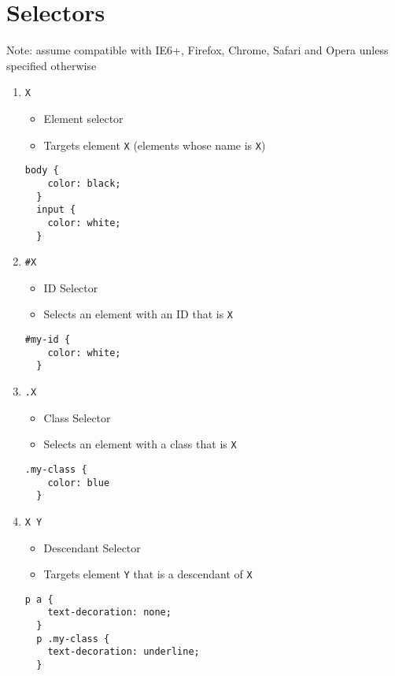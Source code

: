 \documentclass[12pt]{article}
\begin{document}
\section{Selectors}
Note: assume compatible with IE6+, Firefox, Chrome, Safari and Opera unless specified otherwise

\begin{enumerate}
\item {\texttt{X}}
  \begin{itemize}
    \item Element selector
    \item Targets element \texttt{X} (elements whose name is \texttt{X})
  \end{itemize}
  \begin{lstlisting}[frame=single]
  body {
    color: black;
  }
  input {
    color: white;
  }
  \end{lstlisting}

\item {\texttt{\#X}}
  \begin{itemize}
    \item ID Selector
    \item Selects an element with an ID that is \texttt{X}
  \end{itemize}
  \begin{lstlisting}[frame=single]
  #my-id {
    color: white;
  }
  \end{lstlisting}

\item {\texttt{.X}}
  \begin{itemize}
    \item Class Selector
    \item Selects an element with a class that is \texttt{X}
  \end{itemize}
  \begin{lstlisting}[frame=single]
  .my-class {
    color: blue
  }
  \end{lstlisting}

\item {\texttt{X Y}}
  \begin{itemize}
    \item Descendant Selector
    \item Targets element \texttt{Y} that is a descendant of \texttt{X}
  \end{itemize}
  \begin{lstlisting}[frame=single]
  p a {
    text-decoration: none;
  }
  p .my-class {
    text-decoration: underline;
  }
  \end{lstlisting}


\end{enumerate}
\end{document}

